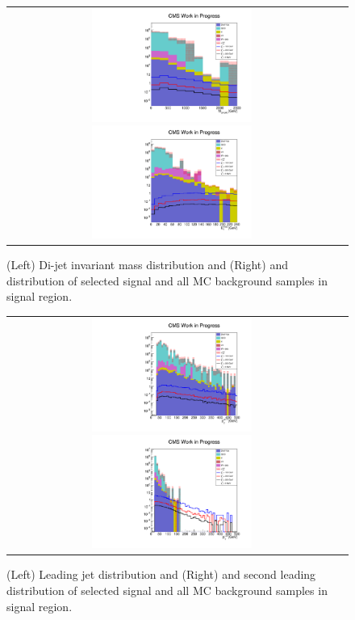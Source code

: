 \begin{figure}[tbh!]
	\centering
	\begin{tabular}{cc}
		\includegraphics[width=0.5\textwidth]{analysis/pics/h_dijetinvariantmass_Taui2TightIso.pdf}
		\includegraphics[width=0.5\textwidth]{analysis/pics/h_met_Taui2TightIso.pdf} 		
	\end{tabular}
	\caption{(Left) Di-jet invariant mass distribution and (Right) and \met distribution of selected signal and all MC background samples in signal region.}
	\label{fig::crplots1_Taui2TightIso_13tev_results}
\end{figure}

\begin{figure}[tbh!]
	\centering
	\begin{tabular}{cc}
		\includegraphics[width=0.5\textwidth]{analysis/pics/h_jet1pt_Taui2TightIso.pdf}
		\includegraphics[width=0.5\textwidth]{analysis/pics/h_tau2pt_Taui2TightIso.pdf} 		
	\end{tabular}
	\caption{(Left) Leading jet \pt distribution and (Right) and second leading \hadtau \pt distribution of selected signal and all MC background samples in signal region.}
	\label{fig::crplots2_Taui2TightIso_13tev_results}
\end{figure}


